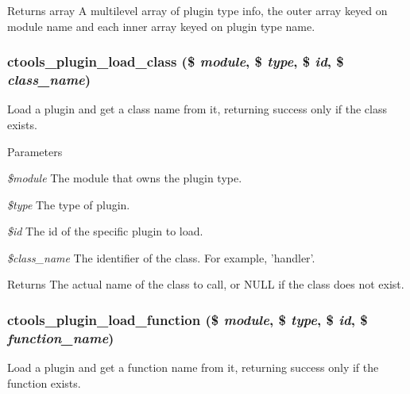 \begin{DoxyReturn}{Returns}
array A multilevel array of plugin type info, the outer array keyed on module name and each inner array keyed on plugin type name. 
\end{DoxyReturn}
\hypertarget{ctools_2includes_2plugins_8inc_a4ad26242dff8fde79ed85d331fcf1198}{
\subsubsection[{ctools\_\-plugin\_\-load\_\-class}]{\setlength{\rightskip}{0pt plus 5cm}ctools\_\-plugin\_\-load\_\-class (\$ {\em module}, \/  \$ {\em type}, \/  \$ {\em id}, \/  \$ {\em class\_\-name})}}
\label{ctools_2includes_2plugins_8inc_a4ad26242dff8fde79ed85d331fcf1198}
Load a plugin and get a class name from it, returning success only if the class exists.


\begin{DoxyParams}{Parameters}
\item[{\em \$module}]The module that owns the plugin type. \item[{\em \$type}]The type of plugin. \item[{\em \$id}]The id of the specific plugin to load. \item[{\em \$class\_\-name}]The identifier of the class. For example, 'handler'.\end{DoxyParams}
\begin{DoxyReturn}{Returns}
The actual name of the class to call, or NULL if the class does not exist. 
\end{DoxyReturn}
\hypertarget{ctools_2includes_2plugins_8inc_aebe9811456caa97876b9b7bc12910fef}{
\subsubsection[{ctools\_\-plugin\_\-load\_\-function}]{\setlength{\rightskip}{0pt plus 5cm}ctools\_\-plugin\_\-load\_\-function (\$ {\em module}, \/  \$ {\em type}, \/  \$ {\em id}, \/  \$ {\em function\_\-name})}}
\label{ctools_2includes_2plugins_8inc_aebe9811456caa97876b9b7bc12910fef}
Load a plugin and get a function name from it, returning success only if the function exists.


